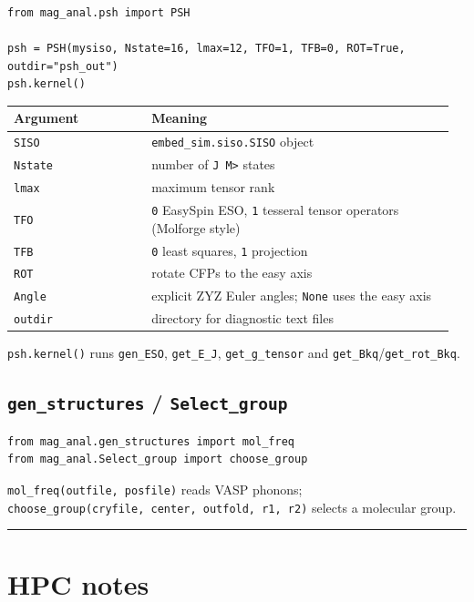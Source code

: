 \documentclass[11pt,a4paper]{article}
\providecommand{\texorpdfstring}[2]{#1}
\begin{document}
\begin{lstlisting}
from mag_anal.psh import PSH

psh = PSH(mysiso, Nstate=16, lmax=12, TFO=1, TFB=0, ROT=True, outdir="psh_out")
psh.kernel()
\end{lstlisting}

\begin{longtable}[]{@{}>{\raggedright\arraybackslash}p{0.30\linewidth} >{\raggedright\arraybackslash}p{0.66\linewidth}@{}}
\toprule
Argument & Meaning\tabularnewline
\midrule
\endhead
\texttt{SISO} & \texttt{embed\_sim.siso.SISO} object\tabularnewline
\texttt{Nstate} & number of \texttt{\textbar{}J\ M\textgreater{}}
states\tabularnewline
\texttt{lmax} & maximum tensor rank\tabularnewline
\texttt{TFO} & \texttt{0} EasySpin ESO, \texttt{1} tesseral tensor
operators (Molforge style)\tabularnewline
\texttt{TFB} & \texttt{0} least squares, \texttt{1}
projection\tabularnewline
\texttt{ROT} & rotate CFPs to the easy axis\tabularnewline
\texttt{Angle} & explicit ZYZ Euler angles; \texttt{None} uses the easy
axis\tabularnewline
\texttt{outdir} & directory for diagnostic text files\tabularnewline
\bottomrule
\end{longtable}

\texttt{psh.kernel()} runs \texttt{gen\_ESO}, \texttt{get\_E\_J},
\texttt{get\_g\_tensor} and \texttt{get\_Bkq}/\texttt{get\_rot\_Bkq}.

\subsection{\texorpdfstring{\texttt{gen\_structures} /
\texttt{Select\_group}}{9.6 gen\_structures / Select\_group}}\label{gen_structures-select_group}

\begin{lstlisting}
from mag_anal.gen_structures import mol_freq
from mag_anal.Select_group import choose_group
\end{lstlisting}

\texttt{mol\_freq(outfile,\ posfile)} reads VASP phonons;
\texttt{choose\_group(cryfile,\ center,\ outfold,\ r1,\ r2)} selects a
molecular group.

\begin{center}\rule{0.5\linewidth}{0.4pt}\end{center}

\section{HPC notes}\label{hpc-notes}
\end{document}
